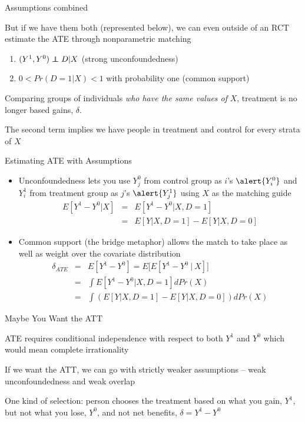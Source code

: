 \documentclass{beamer}
\newcommand\independent{\protect\mathpalette{\protect\independenT}{\perp}}
\def\independenT#1#2{\mathrel{\rlap{$#1#2$}\mkern2mu{#1#2}}}
\begin{document}
\begin{frame}{Assumptions combined}
	
But if we have them both (represented below), we can even outside of an RCT estimate the ATE through nonparametric matching
  \begin{enumerate}
		\item $(Y^1,Y^0) \independent{D} | X$ (strong unconfoundedness)
		\item $0<Pr(D=1|X)<1$ with probability one (common support)
  \end{enumerate}

\bigskip
Comparing groups of individuals \emph{who have the same values of} $X$, treatment is no longer based gains, $\delta$. 

\bigskip

The second term implies we have people in treatment and control for every strata of $X$
\end{frame}


\begin{frame}{Estimating ATE with Assumptions}


	\begin{itemize}
	\item Unconfoundedness lets you use $Y^0_j$ from control group as $i$'s $\alert{Y^0_i}$ and $Y^1_i$ from treatment group as $j$'s $\alert{Y^1_j}$ using $X$ as the matching guide
		\begin{eqnarray*}
		E[Y^1-Y^0|X] &=& E[Y^1 - Y^0 | X,D=1] \\
		&=&E[Y|X,D=1] - E[Y|X,D=0]
		\end{eqnarray*}
	\item Common support (the bridge metaphor) allows the match to take place as well as weight over the covariate distribution 
		\begin{eqnarray*}
		\delta_{ATE} &=&E[Y^1-Y^0] = E\bigg[ E[Y^1 - Y^0 \ \vert \ X] \bigg] \\
		&=& \int E[Y^1 - Y^0 |X,D=1] dPr(X) \\
		&=& \int \left(E[Y|X,D=1] - E[Y|X,D=0]\right)dPr(X)
		\end{eqnarray*}
	\end{itemize}

\end{frame}



\begin{frame}{Maybe You Want the ATT}

ATE requires conditional independence with respect to both $Y^1$ and $Y^0$ which would mean complete irrationality 

\bigskip

If we want the ATT, we can go with strictly weaker assumptions -- weak unconfoundedness and weak overlap

\bigskip

One kind of selection: person  chooses the treatment based on what you gain, $Y^1$, but not what you lose, $Y^0$, and not net benefits, $\delta=Y^1-Y^0$

\end{frame}
\end{document}
